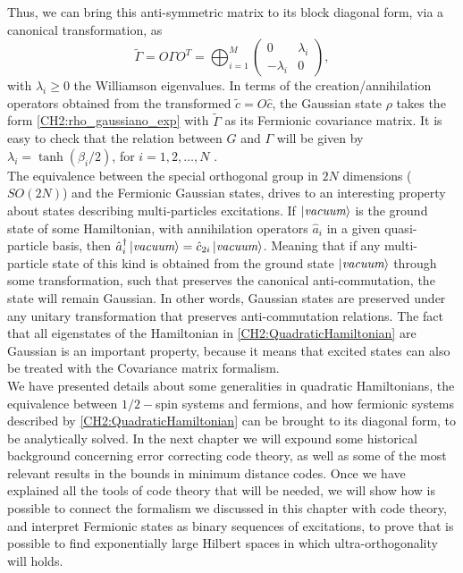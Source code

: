 Thus, we can bring this anti-symmetric matrix to its block diagonal form, via a canonical transformation, as
\begin{equation}
\tilde{\Gamma} = O \Gamma O^{T}=\bigoplus_{i=1}^{M}\left(\begin{array}{cc}
0 & \lambda_{i} \\
-\lambda_{i} & 0
\end{array}\right),
\label{CH2:Williamson_Cov_fermionic_matrix}
\end{equation}
with $\lambda_i\geq 0$ the Williamson eigenvalues. In terms of the creation/annihilation operators obtained from the transformed $\tilde{c}=O\hat{c}$, the Gaussian state $\rho$ takes the form \eqref{CH2:rho_gaussiano_exp} with $\tilde{\Gamma}$ as its Fermionic covariance matrix. It is easy to check that the relation between $G$ and $\Gamma$ will be given by $\lambda_{i} = \tanh{\left(\beta_{i}/2\right)}$, for $i=1,2,\ldots,N$ \cite{kraus_pairing_2009}.\\

\indent The equivalence between the special orthogonal group in $2N$ dimensions ($SO(2N)$) and the Fermionic Gaussian states, drives to an interesting  property about states describing multi-particles excitations. If $\mathinner{|{\textit{vacuum}}\rangle}$ is the ground state of some Hamiltonian, with annihilation operators $\hat{a}_{i}$ in a given quasi-particle basis, then $\hat{a}_{i}^{\dagger}\mathinner{|{\textit{vacuum}}\rangle} = \hat{c}_{2i}\mathinner{|{\textit{vacuum}}\rangle}$. Meaning that if any multi-particle state of this kind is obtained from the ground state $\mathinner{|{\textit{vacuum}}\rangle}$ through some transformation, such that preserves the canonical anti-commutation, the state will remain Gaussian. In other words, Gaussian states are preserved under any unitary transformation that preserves anti-commutation relations. The fact that all eigenstates of the Hamiltonian in \eqref{CH2:QuadraticHamiltonian} are Gaussian is an important property, because it means that excited states can also be treated with the Covariance matrix formalism.\\


 \indent We have presented details about some generalities in quadratic Hamiltonians, the equivalence between $1/2-$spin systems and fermions, and how fermionic systems described by \eqref{CH2:QuadraticHamiltonian} can be brought to its diagonal form, to be analytically solved. In the next chapter we will expound some historical background concerning  error correcting code theory, as well as some of the most relevant results in the bounds in minimum distance codes. Once we have explained all the tools of code theory that will be needed, we will show how is possible to connect the formalism we discussed in this chapter with code theory, and interpret Fermionic states as binary sequences of excitations, to prove that is possible to find exponentially large Hilbert spaces in which ultra-orthogonality will holds. 
    
